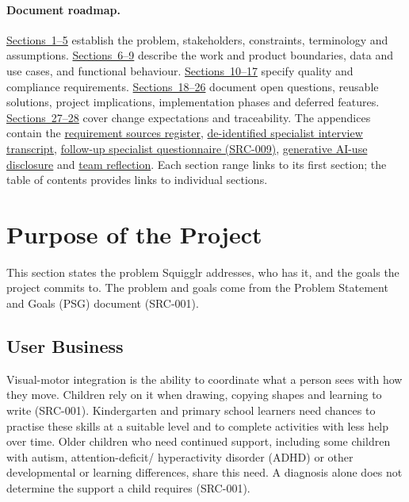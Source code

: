 \documentclass[12pt]{article}
\renewcommand{\_}{\textunderscore\allowbreak}%
\begin{document}
\paragraph{Document roadmap.}
\hyperref[sec:purpose]{Sections~1--5} establish the problem, stakeholders,
constraints, terminology and assumptions.
\hyperref[sec:work-scope]{Sections~6--9} describe the work and product
boundaries, data and use cases, and functional behaviour.
\hyperref[sec:look-feel]{Sections~10--17} specify quality and compliance
requirements. \hyperref[sec:open-issues]{Sections~18--26} document open
questions, reusable solutions, project implications, implementation phases and
deferred features. \hyperref[sec:changes]{Sections~27--28} cover change
expectations and traceability. The appendices contain the
\hyperref[app:sources]{requirement sources register},
\hyperref[app:interview]{de-identified specialist interview transcript},
\hyperref[app:questionnaire]{follow-up specialist questionnaire (SRC-009)},
\hyperref[app:ai-use]{generative AI-use disclosure} and
\hyperref[app:reflection]{team reflection}. Each section range links to its
first section; the table of contents provides links to individual sections.

\section{Purpose of the Project}
\label{sec:purpose}

This section states the problem Squigglr addresses, who has it, and the goals
the project commits to. The problem and goals come from the Problem Statement
and Goals (PSG) document (SRC-001).

\subsection{User Business}

Visual-motor integration is the ability to coordinate what a person sees with
how they move. Children rely on it when drawing, copying shapes and learning to
write (SRC-001). Kindergarten and primary school learners need chances to
practise these skills at a suitable level and to complete activities with less
help over time. Older children who need continued support, including some
children with autism, attention-deficit/\allowbreak%
hyperactivity disorder (ADHD) or other developmental or learning differences,
share this need. A diagnosis alone does not determine the support a child
requires (SRC-001).
\end{document}
